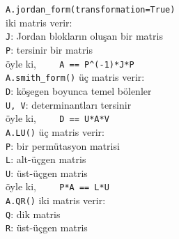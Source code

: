 \documentclass{article}
\newcommand{\ex}{\color{blue}}
\newcommand{\skipin}{\hspace*{12pt}}
\begin{document}
\begin{multicols*}{3}
{\ex\verb!A.jordan_form(transformation=True)!}\\
\skipin iki matris verir:\\
\skipin\skipin\verb!J!: Jordan blokların oluşan bir matris\\
\skipin\skipin\verb!P!: tersinir bir matris\\
\skipin\skipin öyle ki, \verb!    A == P^(-1)*J*P!\\
%
{\ex\verb!A.smith_form()!} üç matris verir:\\
\skipin\verb!D!: köşegen boyunca temel bölenler\\
\skipin\verb!U, V!: determinantları tersinir\\
\skipin öyle ki, \verb!    D == U*A*V!\\
%
{\ex\verb!A.LU()!} üç  matris verir:\\
\skipin\verb!P!: bir permütasyon matrisi\\
\skipin\verb!L!: alt-üçgen matris\\
\skipin\verb!U!: üst-üçgen matris\\
\skipin öyle ki, \verb!    P*A == L*U!\\
%
{\ex\verb!A.QR()!} iki matris verir:\\
\skipin\verb!Q!: dik matris\\
\skipin\verb!R!: üst-üçgen matris\\

\end{multicols*}
\end{document}
